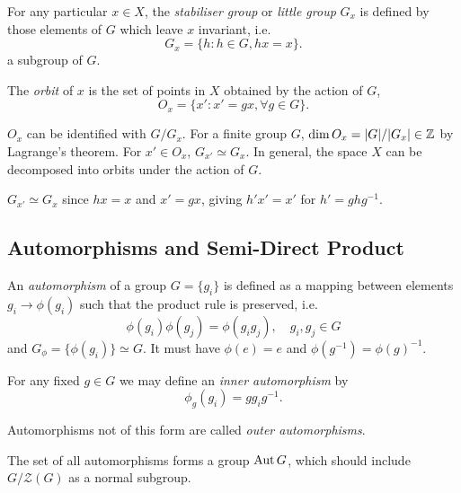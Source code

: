 \documentclass[a4paper,11pt]{article}
\begin{document}
	\begin{defi}
		For any particular $x \in X$, the \emph{stabiliser group} or \emph{little group} $G_x$ is defined by those elements of $G$ which leave $x$ invariant, i.e.\ 
		\[
			G_x = \{h : h\in G, h x = x\}.
		\]
		a subgroup of $G$.
	\end{defi}

	\begin{defi}
		The \emph{orbit} of $x$ is the set of points in $X$ obtained by the action of $G$, 
		\[
			O_x = \{x' : x' = g x, \forall g \in G\}.
		\]
	\end{defi}

	\begin{thm}
		$O_x$ can be identified with $G / G_x$. For a finite group $G$, $\dim O_x = \abs{G}/\abs{G_x} \in \mathbb{Z}$ by Lagrange's theorem. For $x' \in O_x$, $G_{x'} \simeq G_x$. In general, the space $X$ can be decomposed into orbits under the action of $G$.
	\end{thm}

	\begin{hint}
		$G_{x'} \simeq G_x$ since $hx = x$ and $x' = gx$, giving $h'x' = x'$ for $h' = ghg^{-1}$. 
	\end{hint}
	
	\subsection{Automorphisms and Semi-Direct Product} 

	\begin{defi}
		An \emph{automorphism} of a group $G = \{g_i\}$ is defined as a mapping between elements $g_i \to \phi(g_i)$ such that the product rule is preserved, i.e. 
		\[
			\phi(g_i) \phi(g_j) = \phi(g_i g_j), \quad g_i, g_j \in G
		\]
		and $G_\phi = \{\phi(g_i)\} \simeq G$. It must have $\phi(e) = e$ and $\phi(g^{-1}) = \phi(g)^{-1}$. 

		For any fixed $g \in G$ we may define an \emph{inner automorphism} by
		\[
			\phi_g (g_i) = g g_i g^{-1}.
		\]
		
		Automorphisms not of this form are called \emph{outer automorphisms}.
	\end{defi}

	\begin{prop}
		The set of all automorphisms forms a group $\operatorname{Aut} G$, which should include $G / \mathcal{Z}(G)$ as a normal subgroup.
	\end{prop}
	
\end{document}
